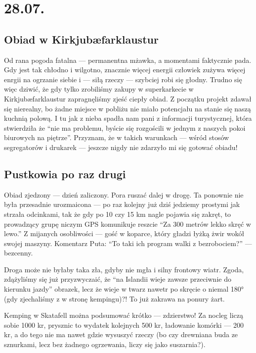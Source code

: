 \chapter*{28.07.}

\section*{Obiad w Kirkjubæfarklaustur}

Od rana pogoda fatalna --- permanentna mżawka, a momentami faktycznie pada. Gdy jest tak chłodno i wilgotno, znacznie więcej energii człowiek zużywa więcej enrgii na ogrzanie siebie i --- siłą rzeczy --- szybciej robi się głodny. Trudno się więc dziwić, że gdy tylko zrobiliśmy zakupy w superkarkecie w Kirkjubæfarklaustur zapragnęliśmy zjeść ciepły obiad. Z początku projekt zdawał się nierealny, bo żadne miejsce w pobliżu nie miało potencjału na stanie się naszą kuchnią polową. I tu jak z nieba spadła nam pani z informacji turystycznej, która stwierdziła że “nie ma problemu, byście się rozgościli w jednym z naszych pokoi biurowych na piętrze”. Przyznam, że w takich warunkach --- wśród stosów segregatorów i drukarek --- jeszcze nigdy nie zdarzyło mi się gotować obiadu!


\section*{Pustkowia po raz drugi}

Obiad zjedzony --- dzień zaliczony. Pora ruszać dalej w drogę. Ta ponownie nie była przesadnie urozmaicona --- po raz kolejny już dziś jedziemy prostymi jak strzała odcinkami, tak że gdy po 10 czy 15 km nagle pojawia się zakręt, to prowadzący grupę niczym GPS komunikuje reszcie “Za 300 metrów lekko skręć w lewo.” Z mijanych osobliwości --- gość w koparce, który gładzi łyżką żwir wokół swojej maszyny. Komentarz Puta: “To taki ich program walki z bezrobociem?” --- bezcenny.


Droga może nie byłaby taka zła, gdyby nie mgła i silny frontowy wiatr. Zgoda, zdążyliśmy się już przyzwyczaić, że “na Islandii wieje zawsze przeciwnie do kierunku jazdy” {obrazek}, lecz że wieje w twarz nawetr po skręcie o niemal 180° (gdy zjechaliśmy z  w stronę kempingu)?! To już zakrawa na ponury żart.

Kemping w Skatafell można podsumować krótko --- zdzierstwo! Za nocleg liczą sobie 1000 kr, prysznic to wydatek kolejnych 500 kr, ładowanie komórki --- 200 kr, a do tego nie ma nawet gdzie wysuszyć rzeczy (bo czy drewniana buda ze sznurkami, lecz bez żadnego ogrzewania, liczy się jako suszarnia?).
